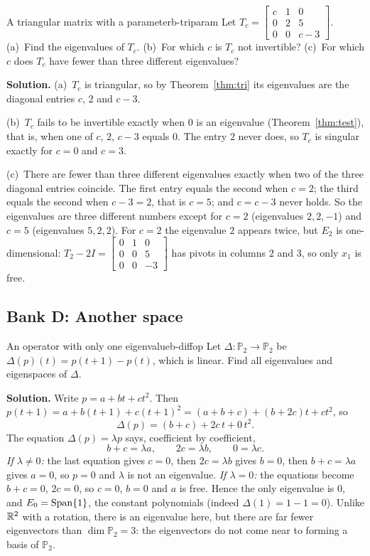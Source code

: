 \documentclass[11pt]{article}
\begin{document}
\begin{exmp}{A triangular matrix with a parameter}{b-triparam}
Let $T_c=\begin{bmatrix}c&1&0\\0&2&5\\0&0&c-3\end{bmatrix}$. (a)~Find the eigenvalues of $T_c$. (b)~For which $c$ is $T_c$ not invertible? (c)~For which $c$ does $T_c$ have fewer than three different eigenvalues?

\textbf{Solution.} (a)~$T_c$ is triangular, so by Theorem~\ref{thm:tri} its eigenvalues are the diagonal entries $c$, $2$ and $c-3$.

(b)~$T_c$ fails to be invertible exactly when $0$ is an eigenvalue (Theorem~\ref{thm:test}), that is, when one of $c$, $2$, $c-3$ equals $0$. The entry $2$ never does, so $T_c$ is singular exactly for $c=0$ and $c=3$.

(c)~There are fewer than three different eigenvalues exactly when two of the three diagonal entries coincide. The first entry equals the second when $c=2$; the third equals the second when $c-3=2$, that is $c=5$; and $c=c-3$ never holds. So the eigenvalues are three different numbers except for $c=2$ (eigenvalues $2,2,-1$) and $c=5$ (eigenvalues $5,2,2$). For $c=2$ the eigenvalue $2$ appears twice, but $E_2$ is one-dimensional: $T_2-2I=\begin{bmatrix}0&1&0\\0&0&5\\0&0&-3\end{bmatrix}$ has pivots in columns $2$ and $3$, so only $x_1$ is free.
\end{exmp}

\subsection*{Bank D: Another space}
\begin{exmp}{An operator with only one eigenvalue}{b-diffop}
Let $\Delta:\mathbb{P}_2\to\mathbb{P}_2$ be $\Delta(p)(t)=p(t+1)-p(t)$, which is linear. Find all eigenvalues and eigenspaces of $\Delta$.

\textbf{Solution.} Write $p=a+bt+ct^2$. Then $p(t+1)=a+b(t+1)+c(t+1)^2=(a+b+c)+(b+2c)t+ct^2$, so
\[
\Delta(p)=(b+c)+2c\,t+0\,t^2.
\]
The equation $\Delta(p)=\lambda p$ says, coefficient by coefficient,
\[
b+c=\lambda a,\qquad 2c=\lambda b,\qquad 0=\lambda c.
\]
\emph{If $\lambda\neq0$:} the last equation gives $c=0$, then $2c=\lambda b$ gives $b=0$, then $b+c=\lambda a$ gives $a=0$, so $p=0$ and $\lambda$ is not an eigenvalue. \emph{If $\lambda=0$:} the equations become $b+c=0$, $2c=0$, so $c=0$, $b=0$ and $a$ is free. Hence the only eigenvalue is $0$, and $E_0=\operatorname{Span}\{1\}$, the constant polynomials (indeed $\Delta(1)=1-1=0$). Unlike $\mathbb{R}^2$ with a rotation, there is an eigenvalue here, but there are far fewer eigenvectors than $\dim\mathbb{P}_2=3$: the eigenvectors do not come near to forming a basis of $\mathbb{P}_2$.
\end{exmp}
\end{document}
